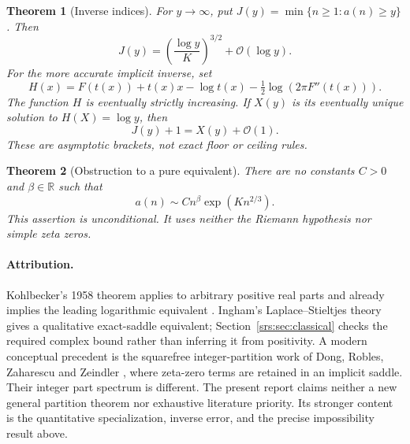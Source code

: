 \documentclass[11pt]{article}
\numberwithin{equation}{section}
\newtheorem{theorem}{Theorem}[section]
\theoremstyle{remark}\newtheorem{remark}[theorem]{Remark}
\newcommand{\Oh}{\mathcal O}
\newcommand{\R}{\mathbb R}
\begin{document}
\begin{theorem}[Inverse indices]\label{srs:thm:inverse}
For $y\to\infty$, put $J(y)=\min\{n\ge1:a(n)\ge y\}$. Then
\begin{equation}
 J(y)=\left(\frac{\log y}{K}\right)^{3/2}+\Oh(\log y).
 \label{srs:eq:explicitinverse}
\end{equation}
For the more accurate implicit inverse, set
\begin{equation}
 H(x)=F(t(x))+t(x)x-\log t(x)-\tfrac12\log(2\pi F''(t(x))).\label{srs:eq:H}
\end{equation}
The function $H$ is eventually strictly increasing. If $X(y)$ is its eventually unique solution to $H(X)=\log y$, then
\begin{equation}
 J(y)+1=X(y)+\Oh(1).
 \label{srs:eq:implicitinverse}
\end{equation}
These are asymptotic brackets, not exact floor or ceiling rules.
\end{theorem}

\begin{theorem}[Obstruction to a pure equivalent]\label{srs:thm:obstruction}
There are no constants $C>0$ and $\beta\in\R$ such that
\begin{equation}
 a(n)\sim C n^\beta\exp(Kn^{2/3}).\label{srs:eq:forbidden}
\end{equation}
This assertion is unconditional. It uses neither the Riemann hypothesis nor simple zeta zeros.
\end{theorem}

\paragraph{Attribution.}
Kohlbecker's 1958 theorem applies to arbitrary positive real parts and already implies the leading logarithmic equivalent \cite[Main Theorem and Corollary 1]{Kohlbecker}. Ingham's Laplace--Stieltjes theory gives a qualitative exact-saddle equivalent; Section~\ref{srs:sec:classical} checks the required complex bound rather than inferring it from positivity. A modern conceptual precedent is the squarefree integer-partition work of Dong, Robles, Zaharescu and Zeindler \cite[Section 6]{DRZZ}, where zeta-zero terms are retained in an implicit saddle. Their integer part spectrum is different. The present report claims neither a new general partition theorem nor exhaustive literature priority. Its stronger content is the quantitative specialization, inverse error, and the precise impossibility result above.
\end{document}
